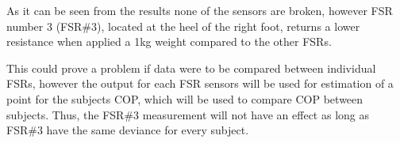 As it can be seen from the results none of the sensors are broken, however FSR number 3 (FSR\#3), located at the heel of the right foot, returns a lower resistance when applied a 1kg weight compared to the other FSRs. 



This could prove a problem if data were to be compared between individual FSRs, however the output for each FSR sensors will be used for estimation of a point for the subjects COP, which will be used to compare COP between subjects. Thus, the FSR\#3 measurement will not have an effect as long as FSR\#3 have the same deviance for every subject. 



